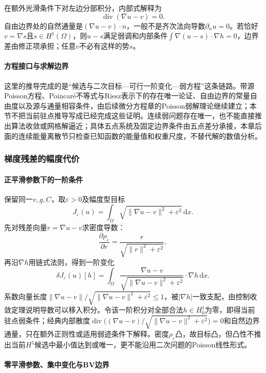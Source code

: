 在额外光滑条件下对左边分部积分，内部式解释为
\[
  \operatorname{div}(\nabla u-v)=0.
\]
自由边界处的自然通量是$(\nabla u-v)\cdot n$，一般不是齐次法向导数$\partial_nu=0$。若恰好$v=\nabla s$且$s\in H^1(\Omega)$，则$u-s$满足弱调和内部条件$\int\nabla(u-s)\cdot\nabla h=0$，边界差由修正项承担；任意$v$不必有这样的势$s$。

\paragraph{方程接口与求解边界}

这里的推导完成的是“候选与二次目标—可行一阶变化—弱方程”这条链路。带源Poisson方程、Poincaré不等式与Riesz表示下的存在唯一论证、自由边界的常量自由度以及源与通量相容条件，由后续微分方程章的Poisson弱解理论继续建立；本节不把当前驻点推导写成已经完成这些证明。连续弱问题存在唯一，也不能直接推出算法收敛或网格解逼近；具体五点系统及固定边界条件由五点差分承接，本章后面的连续能量离散节只检查已知函数的能量值和权重尺度，不替代解的数值分析。

\subsubsection{梯度残差的幅度代价}
\label{subsubsec:amplitude-gradient-cost}

\paragraph{正平滑参数下的一阶条件}

保留同一$v,g,C$，取$\varepsilon>0$及幅度型目标
\[
  J_\varepsilon(u)=\int_\Omega\sqrt{\|\nabla u-v\|^2+\varepsilon^2}\,\mathrm dx.
\]
先对残差向量$r=\nabla u-v$求密度导数：
\[
  \frac{\partial\rho_\varepsilon}{\partial r}
  =\frac{r}{\sqrt{\|r\|^2+\varepsilon^2}},
\]
再沿$\nabla h$用链式法则，得到一阶变化
\[
  \delta J_\varepsilon(u)[h]
  =\int_\Omega
  \frac{\nabla u-v}{\sqrt{\|\nabla u-v\|^2+\varepsilon^2}}
  \cdot\nabla h\,\mathrm dx.
\]
系数向量长度$\|\nabla u-v\|/\sqrt{\|\nabla u-v\|^2+\varepsilon^2}\le1$，被$|\nabla h|$一致支配，由控制收敛定理说明导数可以移入积分。令该一阶积分对全部合法$h\in H_0^1$为零，即得当前驻点弱条件；经典内部散度$\operatorname{div}\big((\nabla u-v)/\sqrt{\|\nabla u-v\|^2+\varepsilon^2}\big)=0$和自然边界通量，只在额外正则性或适用弱迹条件下解释。密度$\rho_\varepsilon$凸，故目标凸，但凸性不推出当前$H^1$候选中最小值达到或唯一，更不能沿用二次问题的Poisson线性形式。

\paragraph{零平滑参数、集中变化与BV边界}


